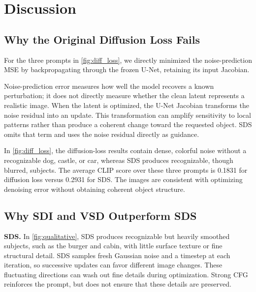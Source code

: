 \section{Discussion}
\label{sec:discussion}

\subsection{Why the Original Diffusion Loss Fails}
\label{sec:diff_loss}

For the three prompts in \cref{fig:diff_loss}, we directly minimized the noise-prediction MSE by
backpropagating through the frozen U-Net, retaining its input Jacobian.

Noise-prediction error measures how well the model recovers a known perturbation; it does not
directly measure whether the clean latent represents a realistic image.
When the latent is optimized, the U-Net Jacobian transforms the noise residual into an update.
This transformation can amplify sensitivity to local patterns rather than produce a coherent change
toward the requested object.
SDS omits that term and uses the noise residual directly as guidance.

In \cref{fig:diff_loss}, the diffusion-loss results contain dense, colorful noise without a
recognizable dog, castle, or car, whereas SDS produces recognizable, though blurred, subjects.
The average CLIP score over these three prompts is 0.1831 for diffusion loss versus 0.2931 for SDS.
The images are consistent with optimizing denoising error without obtaining coherent object
structure.

\subsection{Why SDI and VSD Outperform SDS}
\label{sec:why_better}

\noindent\textbf{SDS.}
In \cref{fig:qualitative}, SDS produces recognizable but heavily smoothed subjects, such as the
burger and cabin, with little surface texture or fine structural detail.
SDS samples fresh Gaussian noise and a timestep at each iteration, so successive updates can favor
different image changes.
These fluctuating directions can wash out fine details during optimization.
Strong CFG reinforces the prompt, but does not ensure that these details are preserved.


